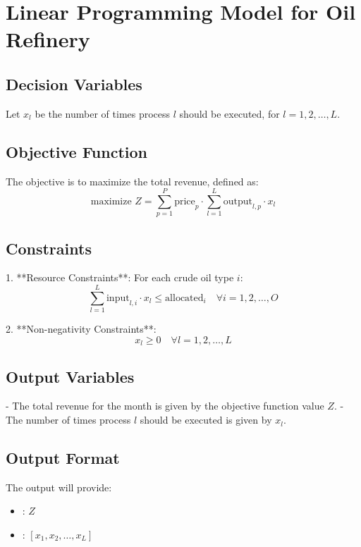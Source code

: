 \documentclass{article}
\begin{document}
\section*{Linear Programming Model for Oil Refinery}

\subsection*{Decision Variables}
Let \( x_l \) be the number of times process \( l \) should be executed, for \( l = 1, 2, \ldots, L \).

\subsection*{Objective Function}
The objective is to maximize the total revenue, defined as:
\[
\text{maximize } Z = \sum_{p=1}^{P} \text{price}_p \cdot \sum_{l=1}^{L} \text{output}_{l,p} \cdot x_l
\]

\subsection*{Constraints}
1. **Resource Constraints**: For each crude oil type \( i \):
\[
\sum_{l=1}^{L} \text{input}_{l,i} \cdot x_l \leq \text{allocated}_i \quad \forall i = 1, 2, \ldots, O
\]

2. **Non-negativity Constraints**: 
\[
x_l \geq 0 \quad \forall l = 1, 2, \ldots, L
\]

\subsection*{Output Variables}
- The total revenue for the month is given by the objective function value \( Z \).
- The number of times process \( l \) should be executed is given by \( x_l \).

\subsection*{Output Format}
The output will provide:
\begin{itemize}
    \item {}: \( Z \)
    \item {}: \( [x_1, x_2, \ldots, x_L] \)
\end{itemize}
\end{document}
